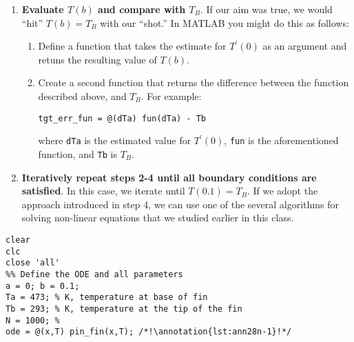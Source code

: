\begin{enumerate}
\item \textbf{Evaluate $T(b)$ and compare with $T_B$}.  If our aim was true, we would ``hit'' $T(b)=T_B$ with our ``shot.''  In MATLAB you might do this as follows:

\begin{enumerate}
\item Define a function that takes the estimate for $T^{\prime}(0)$ as an argument and retuns the resulting value of $T(b)$.
\item Create a second function that returns the difference between the function described above, and $T_B$.  For example:
\begin{lstlisting}[style=myMatlab]
tgt_err_fun = @(dTa) fun(dTa) - Tb
\end{lstlisting}
where \lstinline[style=myMatlab]{dTa} is the estimated value for $T^{\prime}(0)$, \lstinline[style=myMatlab]{fun} is the aforementioned function, and \lstinline[style=myMatlab]{Tb} is $T_B$.
\end{enumerate}

\item \textbf{Iteratively repeat steps 2-4 until all boundary conditions are satisfied}.  In this case, we iterate until $T(0.1) = T_B$. If we adopt the approach introduced in step 4, we can use one of the several algorithms for solving non-linear equations that we studied earlier in this class.   

\end{enumerate}


\begin{lstlisting}[style=myMatlab,name=lec28n-ex1]
%% Lecture 28 - Solving BVPs with the Shooting Method
clear
clc
close 'all'
%% Define the ODE and all parameters
a = 0; b = 0.1;
Ta = 473; % K, temperature at base of fin
Tb = 293; % K, temperature at the tip of the fin
N = 1000; %
ode = @(x,T) pin_fin(x,T); /*!\annotation{lst:ann28n-1}!*/
\end{lstlisting}


